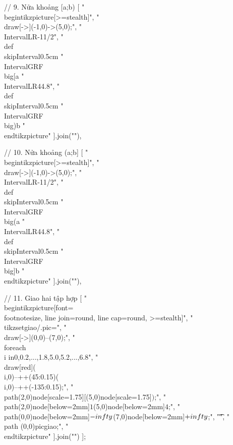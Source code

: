 // 9. Nửa khoảng [a;b)
[
"\\begin{tikzpicture}[>=stealth]",
"\t\\draw[->](-1,0)->(5,0);",
"\t\\IntervalLR{-1}{1/2}",
"\t\\def\\skipInterval{0.5cm}%
"\t\\IntervalGRF{}{}{\\big[}{a}%
"\t\\IntervalLR{4}{4.8}",
"\t\\def\\skipInterval{0.5cm}%
"\t\\IntervalGRF{\\big)}{b}{}{}%
"\\end{tikzpicture}"
].join("\n"),

// 10. Nửa khoảng (a;b]
[
"\\begin{tikzpicture}[>=stealth]",
"\t\\draw[->](-1,0)->(5,0);",
"\t\\IntervalLR{-1}{1/2}",
"\t\\def\\skipInterval{0.5cm}%
"\t\\IntervalGRF{}{}{\\big(}{a}%
"\t\\IntervalLR{4}{4.8}",
"\t\\def\\skipInterval{0.5cm}%
"\t\\IntervalGRF{\\big]}{b}{}{}%
"\\end{tikzpicture}"
].join("\n"),

// 11. Giao hai tập hợp
[
"\\begin{tikzpicture}[font=\\footnotesize, line join=round, line cap=round, >=stealth]",
"\t\\tikzset{giao/.pic={",
		"\t\t\t\\draw[->](0,0)--(7,0);",
		"\t\t\t\\foreach \\i in{0,0.2,...,1.8,5.0,5.2,...,6.8}",
		"\t\t\t\\draw[red](\\i,0)--++(45:0.15)(\\i,0)--++(-135:0.15);",
		"\t\t\t\\path(2,0)node[scale=1.75]{$[$}(5,0)node[scale=1.75]{$)$};",
		"\t\t\t\\path(2,0)node[below=2mm]{$1$}(5,0)node[below=2mm]{$4$};",
		"\t\t\t\\path(0,0)node[below=2mm]{$-\\infty$}(7,0)node[below=2mm]{$+\\infty$};",
		"\t}}",
"\t\\path (0,0)pic{giao};",
"\\end{tikzpicture}"
].join("\n")
];

